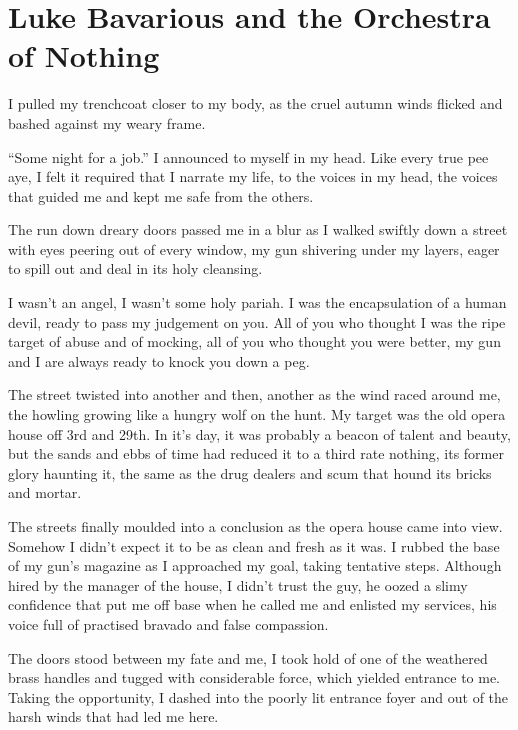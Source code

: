 \chapter[The Orchestra of Nothing]{Luke Bavarious and the Orchestra of Nothing}



I pulled my trenchcoat closer to my body, as the cruel autumn winds
flicked and bashed against my weary frame.

``Some night for a job.'' I announced to myself in my
head. Like every true pee aye, I felt it required that I narrate my
life, to the voices in my head, the voices that guided me and kept
me safe from the others.

The run down dreary doors passed me in a blur as I walked swiftly
down a street with eyes peering out of every window, my gun
shivering under my layers, eager to spill out and deal in its holy
cleansing.



I wasn't an angel, I wasn't some holy pariah. I was the
encapsulation of a human devil, ready to pass my judgement on you.
All of you who thought I was the ripe target of abuse and of
mocking, all of you who thought you were better, my gun and I are
always ready to knock you down a peg.



The street twisted into another and then, another as the wind raced
around me, the howling growing like a hungry wolf on the hunt. My
target was the old opera house off 3rd and 29th. In it's day,
it was probably a beacon of talent and beauty, but the sands and
ebbs of time had reduced it to a third rate nothing, its former
glory haunting it, the same as the drug dealers and scum that hound
its bricks and mortar.

The streets finally moulded into a conclusion as the opera house
came into view. Somehow I didn't expect it to be as clean and
fresh as it was. I rubbed the base of my gun's magazine as I
approached my goal, taking tentative steps. Although hired by the
manager of the house, I didn't trust the guy, he oozed a
slimy confidence that put me off base when he called me and
enlisted my services, his voice full of practised bravado and false
compassion.



The doors stood between my fate and me, I took hold of one of the
weathered brass handles and tugged with considerable force, which
yielded entrance to me. Taking the opportunity, I dashed into the
poorly lit entrance foyer and out of the harsh winds that had led
me here.

